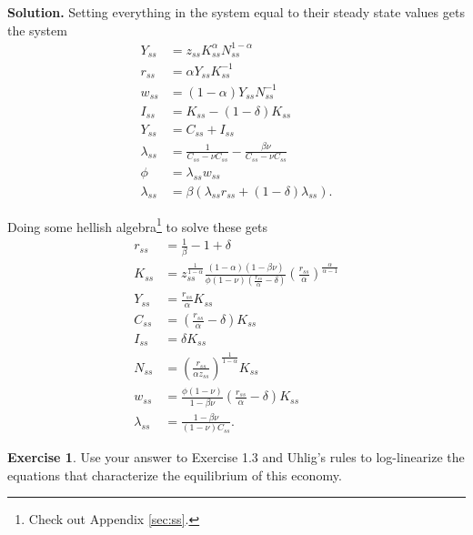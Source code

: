 \documentclass[11pt]{article}
\numberwithin{equation}{section} %
\numberwithin{figure}{section} %
\numberwithin{table}{section} %
\theoremstyle{definition}
\newtheorem{exercise}[theorem]{Exercise}
\newenvironment{solution}{\begin{addmargin}[2em]{0em} {\bf Solution. }}{\end{addmargin}}
\begin{document}
\begin{solution}
    Setting everything in the system equal to their steady state values gets the system
    \begin{align*}
        Y_{ss} &= z_{ss} K_{ss}^\alpha N_{ss}^{1-\alpha} \\
        r_{ss} &= \alpha Y_{ss} K_{ss}^{-1} \\
        w_{ss} &= (1 - \alpha) Y_{ss} N_{ss}^{-1} \\
        I_{ss} &= K_{ss} - (1 - \delta) K_{ss} \\
        Y_{ss} &= C_{ss} + I_{ss} \\
        \lambda_{ss} &= \frac{1}{C_{ss} - \nu C_{ss}} - \frac{\beta \nu}{C_{ss} - \nu C_{ss}} \\
        \phi &= \lambda_{ss} w_{ss} \\
        \lambda_{ss} &= \beta(\lambda_{ss} r_{ss} + (1-\delta) \lambda_{ss}).
    \end{align*}

    Doing some hellish algebra\footnote{Check out Appendix \ref{sec:ss}.} to solve these gets
    \begin{align*}
        r_{ss} &= \frac{1}{\beta} - 1 + \delta \\
        K_{ss} &= z_{ss}^{\frac{1}{1-\alpha}}\frac{(1-\alpha)(1-\beta \nu)}{\phi (1 - \nu) \left(\frac{r_{ss}}{\alpha} - \delta\right)} \left(\frac{r_{ss}}{\alpha}\right)^{\frac{\alpha}{\alpha-1}} \\
        Y_{ss} &= \frac{r_{ss}}{\alpha} K_{ss} \\
        C_{ss} &= \left(\frac{r_{ss}}{\alpha} - \delta\right) K_{ss}\\
        I_{ss} &= \delta K_{ss} \\
        N_{ss} &= \left(\frac{r_{ss}}{\alpha z_{ss}}\right)^{\frac{1}{1-\alpha}} K_{ss} \\
        w_{ss} &= \frac{\phi (1-\nu)}{1-\beta\nu} \left(\frac{r_{ss}}{\alpha} - \delta\right) K_{ss}\\
        \lambda_{ss} &= \frac{1 - \beta\nu}{(1-\nu) C_{ss}}.
    \end{align*}
\end{solution}


\begin{exercise}
    Use your answer to Exercise 1.3 and Uhlig's rules to log-linearize the equations that characterize the equilibrium of this economy.
\end{exercise}
\end{document}
